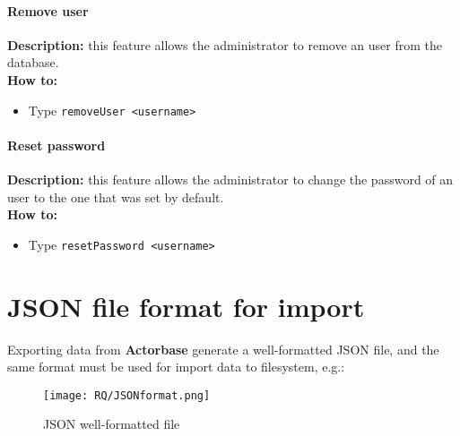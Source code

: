 \documentclass{scalatekids-article}
\begin{document}
\paragraph{Remove user}
\label{sec:removeuser}
\textbf{Description:} this feature allows the administrator to remove an user from the database.\\
\textbf{How to:}
\begin{itemize}
\item Type \texttt{removeUser <username>}
\end{itemize}

\paragraph{Reset password}
\label{sec:resetpassword}
\textbf{Description:} this feature allows the administrator to change the password of an user to the one that was set by default.\\
\textbf{How to:}
\begin{itemize}
\item Type \texttt{resetPassword <username>}
\end{itemize}

\newpage
\appendix

\section{JSON file format for import}
\label{sec:JSONFormat}

Exporting data from \textbf{Actorbase} generate a well-formatted JSON file, and the same format must be
used for import data to filesystem, e.g.:

\begin{figure}[H]
  \begin{center}
    \texttt{[image: RQ/JSONformat.png]}
    \caption{JSON well-formatted file}
  \end{center}
\end{figure}

\listoftables

\listoffigures
\end{document}
